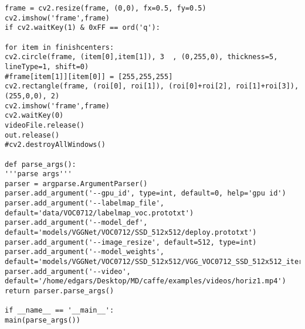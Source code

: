 \documentclass[12pt,paper=a4]{report}
\begin{document}
\begin{lstlisting}[basicstyle=\tiny]
frame = cv2.resize(frame, (0,0), fx=0.5, fy=0.5)
cv2.imshow('frame',frame)
if cv2.waitKey(1) & 0xFF == ord('q'):

for item in finishcenters:
cv2.circle(frame, (item[0],item[1]), 3  , (0,255,0), thickness=5, lineType=1, shift=0)
#frame[item[1]][item[0]] = [255,255,255]
cv2.rectangle(frame, (roi[0], roi[1]), (roi[0]+roi[2], roi[1]+roi[3]), (255,0,0), 2)
cv2.imshow('frame',frame)
cv2.waitKey(0)
videoFile.release()
out.release()
#cv2.destroyAllWindows()

def parse_args():
'''parse args'''
parser = argparse.ArgumentParser()
parser.add_argument('--gpu_id', type=int, default=0, help='gpu id')
parser.add_argument('--labelmap_file',
default='data/VOC0712/labelmap_voc.prototxt')
parser.add_argument('--model_def',
default='models/VGGNet/VOC0712/SSD_512x512/deploy.prototxt')
parser.add_argument('--image_resize', default=512, type=int)
parser.add_argument('--model_weights',
default='models/VGGNet/VOC0712/SSD_512x512/VGG_VOC0712_SSD_512x512_iter_124340.caffemodel')
parser.add_argument('--video', default='/home/edgars/Desktop/MD/caffe/examples/videos/horiz1.mp4')
return parser.parse_args()

if __name__ == '__main__':
main(parse_args())

\end{lstlisting}
\end{document}
